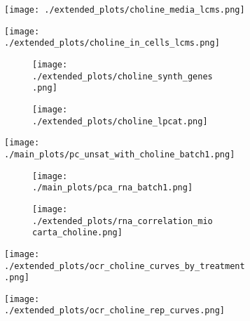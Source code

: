 \begin{figure}[H]
    \begin{subfigure}[t]{.7\textwidth}
        \caption{}
        \texttt{[image: ./extended\_plots/choline\_media\_lcms.png]}        
    \end{subfigure}
    \begin{subfigure}[t]{.3\textwidth}
        \caption{}
        \texttt{[image: ./extended\_plots/choline\_in\_cells\_lcms.png]}        
    \end{subfigure}
    \begin{subfigure}[t]{.25\textwidth}
        \begin{subfigure}[t]{\textwidth}
            \caption{}
            \texttt{[image: ./extended\_plots/choline\_synth\_genes.png]}        
        \end{subfigure}
        \begin{subfigure}[t]{\textwidth}
            \caption{}
            \texttt{[image: ./extended\_plots/choline\_lpcat.png]}        
        \end{subfigure}
    \end{subfigure}
    \begin{subfigure}[t]{.35\textwidth}
        \caption{}
        \texttt{[image: ./main\_plots/pc\_unsat\_with\_choline\_batch1.png]}        
    \end{subfigure} 
    \begin{subfigure}[t]{.2\textwidth}
        \begin{subfigure}[t]{\textwidth}
            \caption{}
            \texttt{[image: ./main\_plots/pca\_rna\_batch1.png]}        
        \end{subfigure}  
        \begin{subfigure}[t]{\textwidth}
            \caption{}
            \texttt{[image: ./extended\_plots/rna\_correlation\_miocarta\_choline.png]}        
        \end{subfigure}
    \end{subfigure}
    \begin{subfigure}[t]{.25\textwidth}
        \caption{}
        \texttt{[image: ./extended\_plots/ocr\_choline\_curves\_by\_treatment.png]}        
    \end{subfigure}
    \begin{subfigure}[t]{.25\textwidth}
        \caption{}
        \texttt{[image: ./extended\_plots/ocr\_choline\_rep\_curves.png]}        

\end{subfigure}
\end{figure}
